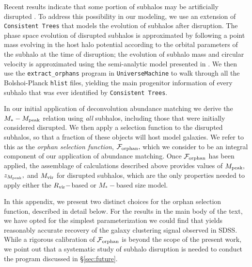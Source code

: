 \documentclass[usenatbib,usegraphicx,letterpaper]{mn2e}
\newcommand{\mstar}{M_{\ast}}
\newcommand{\mvir}{M_{\rm vir}}
\newcommand{\mpeak}{M_{\rm peak}}
\newcommand{\zpeak}{z_{M_{\rm peak}}}
\newcommand{\rvir}{R_{\rm vir}}
\begin{document}


Recent results indicate that some portion of subhalos may be artificially disrupted \citep{guo_white13, campbell_etal17}. To address this possibility in our modeling, we use an extension of {\tt Consistent Trees} that models the evolution of subhalos after disruption. The phase space evolution of disrupted subhalos is approximated by following a point mass evolving in the host halo potential according to the orbital parameters of the subhalo at the time of disruption; the evolution of subhalo mass and circular velocity is approximated using the semi-analytic model presented in \citet{jiang_vdB14}. We then use the {\tt extract\_orphans} program in {\tt UniverseMachine} to walk through all the Bolshoi-Planck {\tt hlist} files, yielding the main progenitor information of every subhalo that was ever identified by {\tt Consistent Trees}. 

In our initial application of deconvolution abundance matching we derive the $\mstar-\mpeak$ relation using {\em all} subhalos, including those that were initially considered disrupted. We then apply a selection function to the disrupted subhalos, so that a fraction of these objects will host model galaxies. We refer to this as the {\em orphan selection function}, $\mathcal{F}_{\rm orphan},$ which we consider to be an integral component of our application of abundance matching. Once $\mathcal{F}_{\rm orphan}$ has been applied, the assemblage of calculations described above provides values of $\mpeak,$ $\zpeak,$ and $\mvir$ for disrupted subhalos, which are the only properties needed to apply either the $\rvir-$based or $\mstar-$based size model.

In this appendix, we present two distinct choices for the orphan selection function, described in detail below. For the results in the main body of the text, we have opted for the simplest parameterization we could find that yields reasonably accurate recovery of the galaxy clustering signal observed in SDSS. While a rigorous calibration of $\mathcal{F}_{\rm orphan}$ is beyond the scope of the present work, we point out that a systematic study of subhalo disruption is needed to conduct the program discussed in \S\ref{sec:future}.
\end{document}
